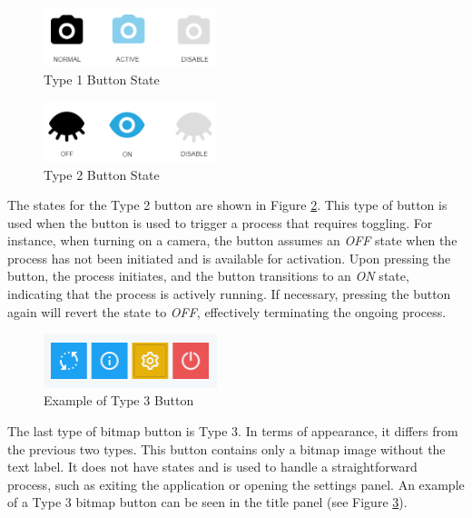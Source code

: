 \begin{figure}[!ht]
    \centering
    \includegraphics[width=0.45\textwidth]{texs/Part2/chapter4/image/type1state.png}
    \caption{Type 1 Button State}
    \label{fig:type1_state}
\end{figure}

\begin{figure}[!ht]
    \centering
    \includegraphics[width=0.45\textwidth]{texs/Part2/chapter4/image/type2state.png}
    \caption{Type 2 Button State}
    \label{fig:type2_state}
\end{figure}

The states for the Type 2 button are shown in Figure \ref{fig:type2_state}. This type of button is used when the button is used to trigger a process that requires toggling. For instance, when turning on a camera, the button assumes an \textit{OFF} state when the process has not been initiated and is available for activation. Upon pressing the button, the process initiates, and the button transitions to an \textit{ON} state, indicating that the process is actively running. If necessary, pressing the button again will revert the state to \textit{OFF}, effectively terminating the ongoing process.

\begin{figure}[!ht]
    \centering
    \includegraphics[width=0.45\textwidth]{texs/Part2/chapter4/image/type3state.png}
    \caption{Example of Type 3 Button}
    \label{fig:type3_state}
\end{figure}

The last type of bitmap button is Type 3. In terms of appearance, it differs from the previous two types. This button contains only a bitmap image without the text label. It does not have states and is used to handle a straightforward process, such as exiting the application or opening the settings panel. An example of a Type 3 bitmap button can be seen in the title panel (see Figure \ref{fig:type3_state}).

